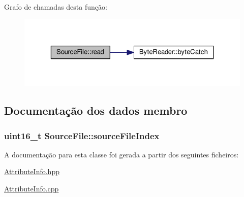 Grafo de chamadas desta função\+:
\nopagebreak
\begin{figure}[H]
\begin{center}
\leavevmode
\includegraphics[width=323pt]{class_source_file_ab03dce42dd5c3f890ac4efa38e9d93e6_cgraph}
\end{center}
\end{figure}




\subsection{Documentação dos dados membro}
\subsubsection[{\texorpdfstring{source\+File\+Index}{sourceFileIndex}}]{\setlength{\rightskip}{0pt plus 5cm}uint16\+\_\+t Source\+File\+::source\+File\+Index}\hypertarget{class_source_file_a3786d0b21d98b8fe5cd7ca9840a12975}{}\label{class_source_file_a3786d0b21d98b8fe5cd7ca9840a12975}


A documentação para esta classe foi gerada a partir dos seguintes ficheiros\+:\begin{DoxyCompactItemize}
\item 
\hyperlink{_attribute_info_8hpp}{Attribute\+Info.\+hpp}\item 
\hyperlink{_attribute_info_8cpp}{Attribute\+Info.\+cpp}\end{DoxyCompactItemize}
